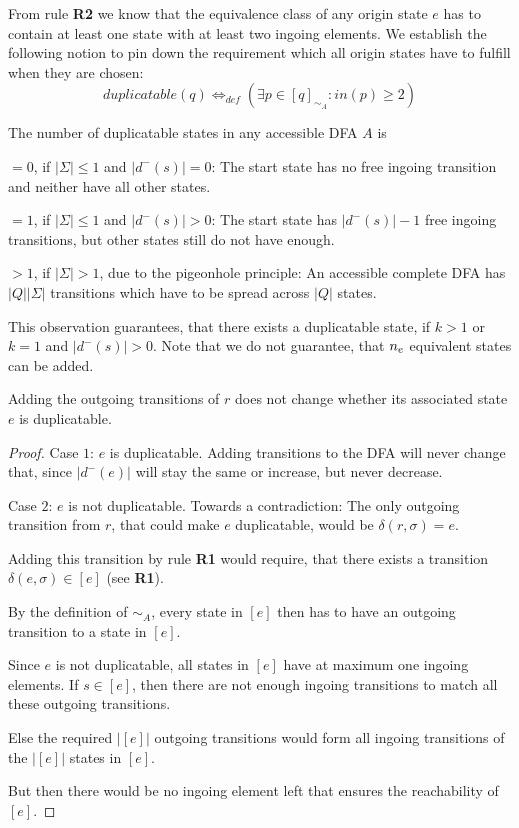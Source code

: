 From rule \textbf{R2} we know that the equivalence class of any origin state $e$ has to contain at least one state with at least two ingoing elements. We establish the following notion to pin down the requirement which all origin states have to fulfill when they are chosen:
\[
duplicatable(q) \Leftrightarrow_{def} (\exists p \in [q]_{\sim_A}\colon in(p)\ge 2)
\]
\begin{observation}
	The number of duplicatable states in any accessible DFA $A$ is
	\begin{description}
		\item$= 0$, if $|\Sigma| \leq 1$ and $|d^-(s)| = 0$: The start state has no free ingoing transition and neither have all other states.
		
		\item$= 1$, if $|\Sigma| \leq 1$ and $|d^-(s)| > 0$: The start state has $|d^-(s)| - 1$ free ingoing transitions, but other states still do not have enough.
		
		\item$> 1$, if $|\Sigma| > 1$, due to the pigeonhole principle: An accessible complete DFA has $|Q||\Sigma|$ transitions which have to be spread across $|Q|$ states.
	\end{description}
\end{observation}
\noindent This observation guarantees, that there exists a duplicatable state, if $k > 1$ or $k = 1$ and $|d^-(s)| > 0$. Note that we do not guarantee, that ${n_e}$ equivalent states can be added.
\begin{lemma}
	Adding the outgoing transitions of $r$ does not change whether its associated state $e$ is duplicatable.
\end{lemma}
\begin{proof}
Case $1$: $e$ is duplicatable. Adding transitions to the DFA will never change that, since $|d^-(e)|$ will stay the same or increase, but never decrease.\par
	
Case $2$: $e$ is not duplicatable. Towards a contradiction: The only outgoing transition from $r$, that could make $e$ duplicatable, would be $\delta(r, \sigma) = e$.
	
Adding this transition by rule \textbf{R1} would require, that there exists a transition $\delta(e, \sigma) \in [e]$ (see \textbf{R1}).
	
By the definition of $\sim_A$, every state in $[e]$ then has to have an outgoing transition to a state in $[e]$.
	
Since $e$ is not duplicatable, all states in $[e]$ have at maximum one ingoing elements. If $s \in [e]$, then there are not enough ingoing transitions to match all these outgoing transitions.

Else the required $|[e]|$ outgoing transitions would form all ingoing transitions of the $|[e]|$ states in $[e]$.
	
But then there would be no ingoing element left that ensures the reachability of $[e]$.
\end{proof}

